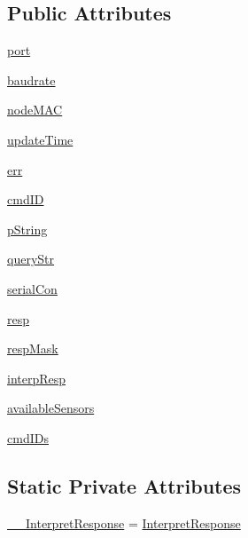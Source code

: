 \subsection*{Public Attributes}
\begin{DoxyCompactItemize}
\item 
\hyperlink{classreadsensor_1_1ReadSensor_aa5479d51839a34226df007973db5b28a}{port}
\item 
\hyperlink{classreadsensor_1_1ReadSensor_a55ad7cd6f26347c571cdc03025d52449}{baudrate}
\item 
\hyperlink{classreadsensor_1_1ReadSensor_aca28301a80b828d13f180b3560acd929}{node\+M\+AC}
\item 
\hyperlink{classreadsensor_1_1ReadSensor_adb42967437e88c29257d8fa7e6dcd8e2}{update\+Time}
\item 
\hyperlink{classreadsensor_1_1ReadSensor_abea3837d8a334bcd560117be3468e555}{err}
\item 
\hyperlink{classreadsensor_1_1ReadSensor_a3f1a8b0a95d14b00ceeb4a1d90db4146}{cmd\+ID}
\item 
\hyperlink{classreadsensor_1_1ReadSensor_a260848062ae91ce183d5b8a7bb4336a9}{p\+String}
\item 
\hyperlink{classreadsensor_1_1ReadSensor_ac90ad89a36244ff79ec5de39250dbe65}{query\+Str}
\item 
\hyperlink{classreadsensor_1_1ReadSensor_ab85a47186a692e87ed91dfbd6421ac9f}{serial\+Con}
\item 
\hyperlink{classreadsensor_1_1ReadSensor_a3bfdf8d80b9b2c6e3756546f66684543}{resp}
\item 
\hyperlink{classreadsensor_1_1ReadSensor_a2add837e5b36f9242b3481f30be5ace9}{resp\+Mask}
\item 
\hyperlink{classreadsensor_1_1ReadSensor_aa9c0ba1400248735f49ccf7f4d7fcbec}{interp\+Resp}
\item 
\hyperlink{classreadsensor_1_1ReadSensor_ae04c9a7ad4cb4a0c68225cea810f9edd}{available\+Sensors}
\item 
\hyperlink{classreadsensor_1_1ReadSensor_ab313380d075409d1fccdd2b47c958cc9}{cmd\+I\+Ds}
\end{DoxyCompactItemize}
\subsection*{Static Private Attributes}
\begin{DoxyCompactItemize}
\item 
\hyperlink{classreadsensor_1_1ReadSensor_a26862f7f2d34ceb3201cfeb7339dd21b}{\+\_\+\+\_\+\+Interpret\+Response} = \hyperlink{classreadsensor_1_1ReadSensor_af42ab8caf111db6f14d49cbcfad445c3}{Interpret\+Response}
\end{DoxyCompactItemize}


